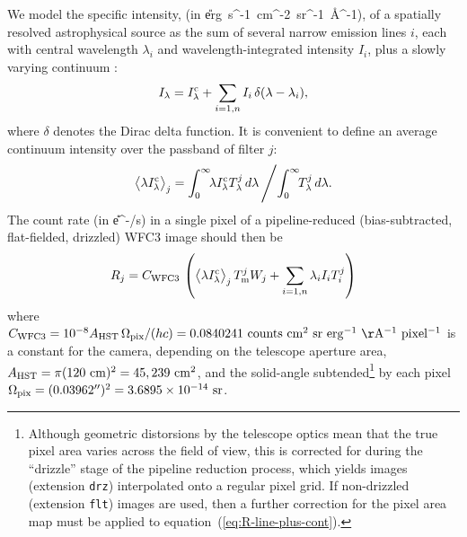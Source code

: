 \documentclass[preprint]{aastex}
\begin{document}
We model the specific intensity, \Ilam (in \U{erg\ s^{-1}\ cm^{-2}\
  sr^{-1}\ \AA^{-1}}), of a spatially resolved astrophysical source as
the sum of several narrow emission lines \(i\), each with central
wavelength \(\lambda_i\) and wavelength-integrated intensity \(I_i\),
plus a slowly varying continuum \Icont:
\begin{equation}
  \label{eq:line-plus-cont}
  I_\lambda = I_\lambda^{\mathrm{c}} + \sum_{i=1, n} I_i\, \delta(\lambda - \lambda_i)  ,
\end{equation}
where \(\delta\) denotes the Dirac delta function.   It is convenient
to define an average continuum intensity over the passband of filter \(j\): 
\begin{equation}
  \label{eq:average}
  \bigl\langle \lambda I_\lambda^{\mathrm{c}} \bigr\rangle_{j} = \int_0^\infty \!\!\lambda I_\lambda^{\mathrm{c}}  T_{\lambda}^{j} \, d\lambda \,
  \Bigg/\! \int_0^\infty \!\!T_{\lambda}^{j} \, d\lambda .
\end{equation}
The count rate (in \U{e^-/s}) in a single pixel of a pipeline-reduced
(bias-subtracted, flat-fielded, drizzled) WFC3 image should then be
\begin{equation}
  \label{eq:R-line-plus-cont}
  R_j 
  = C_{\mathrm{WFC3}}\,
  \left(
    \bigl\langle \lambda I_\lambda^{\mathrm{c}} \bigr\rangle_{j} \, T_{\mathrm{m}}^{j} W_j 
    + \sum_{i=1,n} \lambda_i I_i T_{i}^{j}
  \right)
\end{equation}
where \(\Constant = 10^{-8} \Area\, \Pixel / (h c) = 0.0840241\
\U{counts\ cm^2\ sr\ erg^{-1}\ \AA^{-1}\ pixel^{-1}}\) is a constant
for the camera, depending on the telescope aperture area, \(A_{\mathrm{HST}} =
\pi (120\ \mathrm{cm})^2 = 45,239\ \mathrm{cm^2}\), and the solid-angle
subtended\footnote{Although geometric distorsions by the telescope
  optics mean that the true pixel area varies across the field of
  view, this is corrected for during the ``drizzle'' stage of the
  pipeline reduction process, which yields images (extension
  \texttt{drz}) interpolated onto a regular pixel grid.  If
  non-drizzled (extension \texttt{flt}) images are used, then a
  further correction for the pixel area map must be applied to
  equation~(\ref{eq:R-line-plus-cont}).} by each pixel \(\Omega_{\mathrm{pix}} =
(0.03962'')^2 = 3.6895\times 10^{-14}\ \mathrm{sr}\).

\newcommand\F[1]{%
  \ifmmode\scriptscriptstyle\mathrm{#1}\else #1\fi
}
\newcommand\Falpha[1]{\ensuremath{\alpha_{\F{#1}}}}
\newcommand\Fbeta[1]{\ensuremath{\beta_{\F{#1}}}}
\newcommand\Fgamma[1]{\ensuremath{\gamma_{\F{#1}}}}
\end{document}
